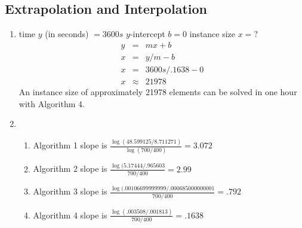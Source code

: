 \documentclass{article}
\begin{document}
\subsection*{Extrapolation and Interpolation}

\begin{enumerate}
\item 
time $y$ (in seconds) $= 3600s$\newline
$y$-intercept $b = 0$\newline
instance size $x = ?$
\begin{eqnarray*}
  \label{Extrapolation}
  y & = & mx+b \\
  x & = & y/m - b \\
  x & = & 3600s/.1638 - 0 \\
  x & \approx & 21978  
\end{eqnarray*}
An instance size of approximately 21978 elements can be solved in one hour with Algorithm 4.
\pagebreak 
\item \begin{enumerate}
\item Algorithm 1 slope is $\frac{\log(48.599125/8.711271)}{\log(700/400)} = 3.072$
\item Algorithm 2 slope is $\frac{\log(5.17444/.965603}{700/400} = 2.99$
\item Algorithm 3 slope is $\frac{\log(.00106699999999/.000685000000001}{700/400} = .792$
\item Algorithm 4 slope is $\frac{\log(.003508/.001813)}{700/400} = .1638$
\end{enumerate}
\end{enumerate}
\end{document}
